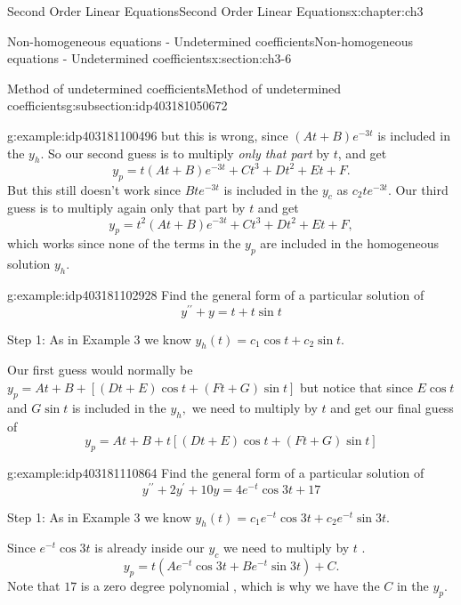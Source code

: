 \documentclass[oneside,10pt,]{book}
\numberwithin{equation}{section}
\numberwithin{equation}{section}
\begin{document}
\begin{chapterptx}{Second Order Linear Equations}{}{Second Order Linear Equations}{}{}{x:chapter:ch3}
\begin{sectionptx}{Non-homogeneous equations - Undetermined coefficients}{}{Non-homogeneous equations - Undetermined coefficients}{}{}{x:section:ch3-6}
\begin{subsectionptx}{Method of undetermined coefficients}{}{Method of undetermined coefficients}{}{}{g:subsection:idp403181050672}
\begin{example}{}{g:example:idp403181100496}
but this is wrong, since \(\left(At+B\right)e^{-3t}\) is included in the \(y_{h}\). So our second guess is to multiply \emph{only that part} by \(t\), and get%
\begin{equation*}
y_{p}=t\left(At+B\right)e^{-3t}+Ct^{3}+Dt^{2}+Et+F.
\end{equation*}
But this still doesn't work since \(Bte^{-3t}\) is included in the \(y_{c}\) as \(c_{2}te^{-3t}\). Our third guess is to multiply again only that part by \(t\) and get%
\begin{equation*}
y_{p}=t^{2}\left(At+B\right)e^{-3t}+Ct^{3}+Dt^{2}+Et+F,
\end{equation*}
which works since none of the terms in the \(y_{p}\) are included in the homogeneous solution \(y_{h}\).%
\end{example}
\begin{example}{}{g:example:idp403181102928}%
Find the general form of a particular solution of%
\begin{equation*}
y^{\prime\prime}+y=t+t\sin t
\end{equation*}
%
\par
Step 1: As in Example 3 we know \(y_{h}(t)=c_{1}\cos t+c_{2}\sin t.\)%
\par
Our first guess would normally be \(y_{p}=At+B+\left[\left(Dt+E\right)\cos t+\left(Ft+G\right)\sin t\right]\) but notice that since \(E\cos t\) and \(G\sin t\) is included in the \(y_{h},\) we need to multiply by \(t\) and get our final guess of%
\begin{equation*}
y_{p}=At+B+t\left[\left(Dt+E\right)\cos t+\left(Ft+G\right)\sin t\right]
\end{equation*}
%
\end{example}
\begin{example}{}{g:example:idp403181110864}%
Find the general form of a particular solution of%
\begin{equation*}
y^{\prime\prime}+2y^{\prime}+10y=4e^{-t}\cos3t+17
\end{equation*}
%
\par
Step 1: As in Example 3 we know \(y_{h}(t)=c_{1}e^{-t}\cos3t+c_{2}e^{-t}\sin3t.\)%
\par
Since \(e^{-t}\cos3t\) is already inside our \(y_{c}\) we need to multiply by \(t\) .%
\begin{equation*}
y_{p}=t\left(Ae^{-t}\cos3t+Be^{-t}\sin3t\right)+C.
\end{equation*}
Note that \(17\) is a zero degree polynomial , which is why we have the \(C\) in the \(y_{p}\).%
\end{example}

\end{subsectionptx}
\end{sectionptx}
\end{chapterptx}
\end{document}
